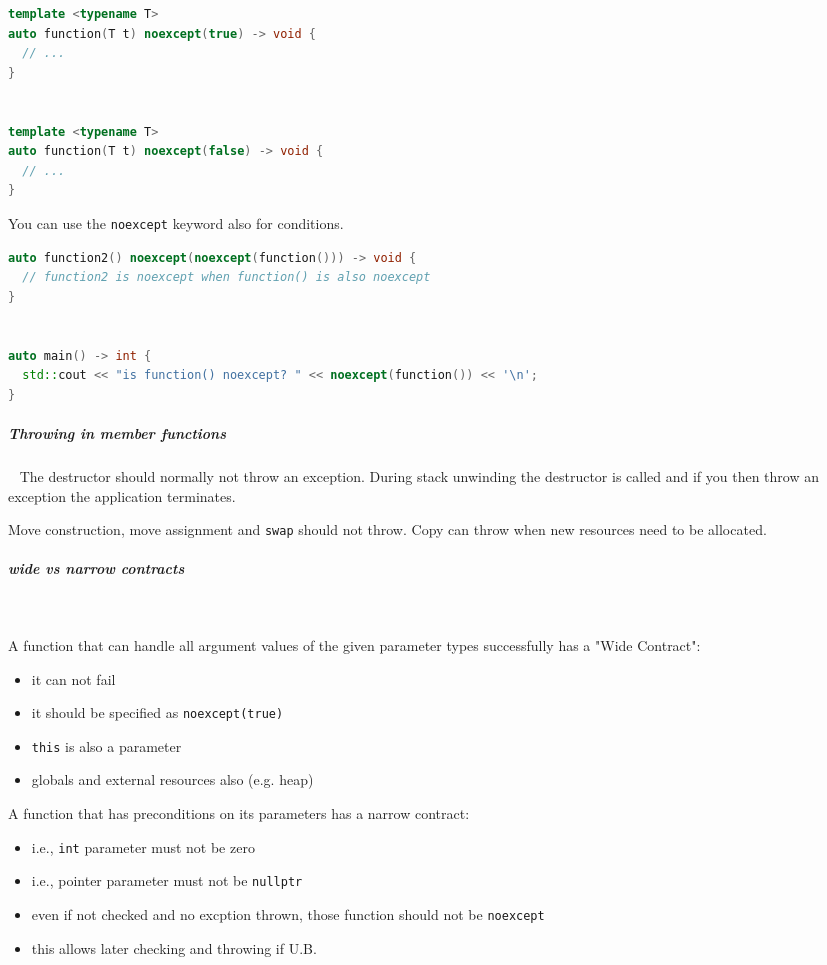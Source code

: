 \documentclass[11pt,twoside,landscape]{article}
\begin{document}
\begin{multicols}{2}
\begin{lstlisting}[language=c++,label=lst:exaple-for-noexcept-in-signature,caption={Exaple for noexcept in signature},captionpos=b,numbers=none]
template <typename T>
auto function(T t) noexcept(true) -> void {
  // ...
}


template <typename T>
auto function(T t) noexcept(false) -> void {
  // ...
}
\end{lstlisting}

You can use the \texttt{noexcept} keyword also for conditions.

\begin{lstlisting}[language=c++,label=lst:example-for-conditional-noexcept,caption={Example for conditional noexcept},captionpos=b,numbers=none]
auto function2() noexcept(noexcept(function())) -> void {
  // function2 is noexcept when function() is also noexcept
}


auto main() -> int {
  std::cout << "is function() noexcept? " << noexcept(function()) << '\n';
}
\end{lstlisting}

\subparagraph{Throwing in member functions} \
\label{sec:org447e02a}
The destructor should normally not throw an exception.
During stack unwinding the destructor is called and if you then throw an exception the application terminates.

Move construction, move assignment and \texttt{swap} should not throw.
Copy can throw when new resources need to be allocated.

\subparagraph{wide vs narrow contracts} \
\label{sec:orgaf7e0a7}

A function that can handle all argument values of the given parameter types successfully has a "Wide Contract":
\begin{itemize}
\item it can not fail
\item it should be specified as \texttt{noexcept(true)}
\item \texttt{this} is also a parameter
\item globals and external resources also (e.g. heap)
\end{itemize}


A function that has preconditions on its parameters has a narrow contract:
\begin{itemize}
\item i.e., \texttt{int} parameter must not be zero
\item i.e., pointer parameter must not be \texttt{nullptr}
\item even if not checked and no excption thrown, those function should not be \texttt{noexcept}
\item this allows later checking and throwing if U.B.
\end{itemize}


\end{multicols}
\end{document}
